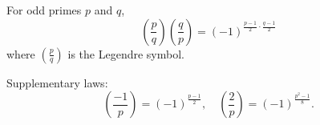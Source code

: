 For odd primes $p$ and $q$,
$$\left(\frac{p}{q}\right)\left(\frac{q}{p}\right) = (-1)^{\frac{p-1}{2}\cdot\frac{q-1}{2}}$$
where $\left(\frac{p}{q}\right)$ is the Legendre symbol.

Supplementary laws:
$$\left(\frac{-1}{p}\right) = (-1)^{\frac{p-1}{2}}, \quad \left(\frac{2}{p}\right) = (-1)^{\frac{p^2-1}{8}}.$$
